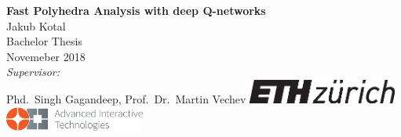 \documentclass[a4paper,twoside,12pt,nochapterprefix]{scrbook}
\begin{document}
%


\newcommand{\mfytext}[0]{my fancy text}

\newcommand{\chpref}[1]{Chapter \ref{#1}}
\newcommand{\secref}[1]{Section \ref{#1}}
\newcommand{\figref}[1]{Figure \ref{#1}}
\newcommand{\tabref}[1]{Table \ref{#1}}
\newcommand{\apxref}[1]{Appendix \ref{#1}}

%
\begin{titlepage}
	\topmargin 1.0cm
	\oddsidemargin 0.0cm
	\evensidemargin 0.0cm
	\centering
	\Huge
	\vspace{3.0cm}
	\textbf{\textsf{Fast Polyhedra Analysis with deep Q-networks}} \\[2.0cm]
	\vspace{3cm}
	\sffamily
	\Large
	Jakub Kotal
	\\[0.8cm]
	\large
	Bachelor Thesis
	\\
	Novemeber 2018
	\\[1.3cm]
	\emph{Supervisor:}\\
	Phd.\ Singh Gagandeep, 		%
	Prof.\ Dr.\ Martin Vechev		%
	\vfill
	\includegraphics*[height=0.8cm]{figures/eth_logo_kurz_pos.eps} \hfill
	\includegraphics*[height=0.8cm]{figures/logo-ait}
	\vspace{3.4cm}
\end{titlepage}
\clearemptydoublepage
\end{document}
